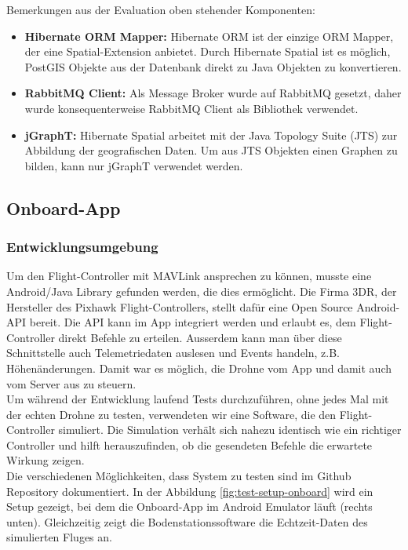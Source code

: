 Bemerkungen aus der Evaluation oben stehender Komponenten:
\begin{itemize}
	\item{\textbf{Hibernate ORM Mapper:} Hibernate ORM ist der einzige ORM Mapper, der eine Spatial-Extension anbietet. Durch Hibernate Spatial ist es möglich, PostGIS Objekte aus der Datenbank direkt zu Java Objekten zu konvertieren.}
	\item{\textbf{RabbitMQ Client:} Als Message Broker wurde auf RabbitMQ gesetzt, daher wurde konsequenterweise RabbitMQ Client als Bibliothek verwendet.}
	\item{\textbf{jGraphT:} Hibernate Spatial arbeitet mit der Java Topology Suite (\Gls{JTS}) zur Abbildung der geografischen Daten. Um aus \Gls{JTS} Objekten einen Graphen zu bilden, kann nur jGraphT verwendet werden.}
\end{itemize}

\subsection{Onboard-App}

\subsubsection{Entwicklungsumgebung}
Um den \Gls{Flight-Controller} mit \Gls{MAVLink} ansprechen zu können, musste eine Android/Java Library gefunden werden, die dies ermöglicht. Die Firma 3DR, der Hersteller des Pixhawk \Gls{Flight-Controller}s, stellt dafür eine Open Source Android-API bereit. Die API kann im App integriert werden und erlaubt es, dem \Gls{Flight-Controller} direkt Befehle zu erteilen. Ausserdem kann man über diese Schnittstelle auch Telemetriedaten auslesen und Events handeln, z.B. Höhenänderungen. Damit war es möglich, die Drohne vom App und damit auch vom Server aus zu steuern.\\

Um während der Entwicklung laufend Tests durchzuführen, ohne jedes Mal mit der echten Drohne zu testen, verwendeten wir eine Software, die den \Gls{Flight-Controller} simuliert. Die Simulation verhält sich nahezu identisch wie ein richtiger Controller und hilft herauszufinden, ob die gesendeten Befehle die erwartete Wirkung zeigen. \\

Die verschiedenen Möglichkeiten, dass System zu testen sind im Github Repository dokumentiert. In der Abbildung \ref{fig:test-setup-onboard} wird ein Setup gezeigt, bei dem die Onboard-App im Android Emulator läuft (rechts unten). Gleichzeitig zeigt die Bodenstationssoftware die Echtzeit-Daten des simulierten Fluges an.

